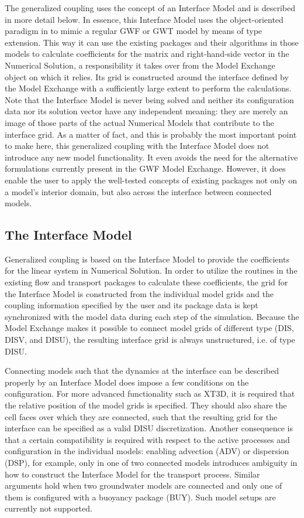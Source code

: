 The generalized coupling uses the concept of an Interface Model and is described in more detail below. In essence, this Interface Model uses the object-oriented paradigm in \mf to mimic a regular GWF or GWT model by means of type extension. This way it can use the existing packages and their algorithms in those models to calculate coefficients for the matrix and right-hand-side vector in the Numerical Solution, a responsibility it takes over from the Model Exchange object on which it relies. Its grid is constructed around the interface defined by the Model Exchange with a sufficiently large extent to perform the calculations. Note that the Interface Model is never being solved and neither its configuration data nor its solution vector have any independent meaning: they are merely an image of those parts of the actual Numerical Models that contribute to the interface grid. As a matter of fact, and this is probably the most important point to make here, this generalized coupling with the Interface Model does not introduce any new model functionality. It even avoids the need for the alternative formulations currently present in the GWF Model Exchange. However, it does enable the user to apply the well-tested concepts of existing \mf packages not only on a model’s interior domain, but also across the interface between connected models.
  
\subsection{The Interface Model}
Generalized coupling is based on the Interface Model to provide the coefficients for the linear system in Numerical Solution. In order to utilize the routines in the existing flow and transport packages to calculate these coefficients, the grid for the Interface Model is constructed from the individual model grids and the coupling information specified by the user and its package data is kept synchronized with the model data during each step of the simulation. Because the Model Exchange makes it possible to connect model grids of different type (DIS, DISV, and DISU), the resulting interface grid is always unstructured, i.e. of type DISU.

Connecting models such that the dynamics at the interface can be described properly by an Interface Model does impose a few conditions on the configuration. For more advanced functionality such as XT3D, it is required that the relative position of the model grids is specified. They should also share the cell faces over which they are connected, such that the resulting grid for the interface can be specified as a valid DISU discretization. Another consequence is that a certain compatibility is required with respect to the active processes and configuration in the individual models: enabling advection (ADV) or dispersion (DSP), for example, only in one of two connected models introduces ambiguity in how to construct the Interface Model for the transport process. Similar arguments hold when two groundwater models are connected and only one of them is configured with a buoyancy package (BUY). Such model setups are currently not supported.

